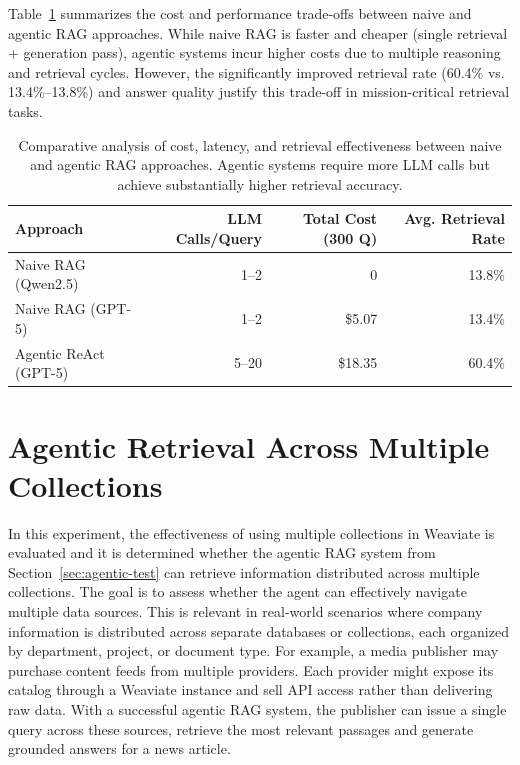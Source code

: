 Table~\ref{tab:naive-vs-agentic-tradeoffs} summarizes the cost and performance trade-offs between naive and agentic \gls{RAG} approaches. While naive \gls{RAG} is faster and cheaper (single retrieval + generation pass), agentic systems incur higher costs due to multiple reasoning and retrieval cycles. However, the significantly improved retrieval rate (60.4\% vs. 13.4\%–13.8\%) and answer quality justify this trade-off in mission-critical retrieval tasks.

\begin{table}[htbp]
    \centering
    \begin{tabular}{l r r r}
        \hline
        Approach & \gls{LLM} Calls/Query & Total Cost (300 Q) & Avg. Retrieval Rate \\
        \hline
        Naive \gls{RAG} (Qwen2.5) & 1--2 & 0 & 13.8\% \\
        Naive \gls{RAG} (\gls{GPT}-5) & 1--2 & \$5.07 & 13.4\% \\
        Agentic ReAct (\gls{GPT}-5) & 5--20 & \$18.35 & 60.4\% \\
        \hline
    \end{tabular}
    \caption{Comparative analysis of cost, latency, and retrieval effectiveness between naive and agentic \gls{RAG} approaches. Agentic systems require more \gls{LLM} calls but achieve substantially higher retrieval accuracy.}
    \label{tab:naive-vs-agentic-tradeoffs}
\end{table}

\section{Agentic Retrieval Across Multiple Collections}
\label{sec:agentic-retrieval-multiple}
In this experiment, the effectiveness of using multiple collections in Weaviate is evaluated and it is determined whether the agentic RAG system from Section~\ref{sec:agentic-test} can retrieve information distributed across multiple collections. The goal is to assess whether the agent can effectively navigate multiple data sources.
This is relevant in real-world scenarios where company information is distributed across separate databases or collections, each organized by department, project, or document type. For example, a media publisher may purchase content feeds from multiple providers. Each provider might expose its catalog through a Weaviate instance and sell API access rather than delivering raw data. With a successful agentic RAG system, the publisher can issue a single query across these sources, retrieve the most relevant passages and generate grounded answers for a news article.

